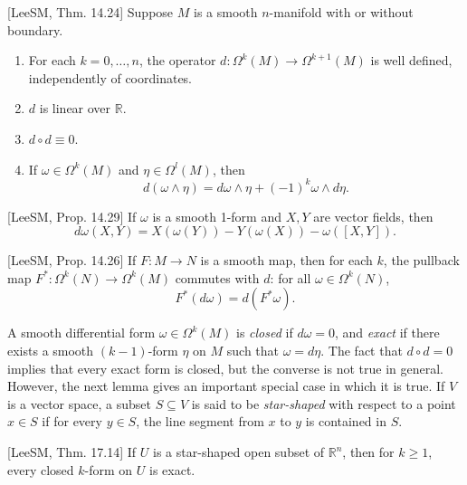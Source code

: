 \begin{proposition}
\label{prop:exterior-differentiation-properties}
[LeeSM, Thm. 14.24] Suppose $M$ is a smooth $n$-manifold with or without boundary.
\begin{enumerate}
\item[(a)] For each $k = 0, \ldots, n$, the operator $d: \Omega^k(M) \to \Omega^{k+1}(M)$ is well defined, independently of coordinates.
\item[(b)] $d$ is linear over $\mathbb{R}$.
\item[(c)] $d \circ d \equiv 0$.
\item[(d)] If $\omega \in \Omega^k(M)$ and $\eta \in \Omega^l(M)$, then
\[
d(\omega \wedge \eta) = d\omega \wedge \eta + (-1)^k \omega \wedge d\eta.
\]
\end{enumerate}
\end{proposition}

\begin{proposition}
\label{prop:exterior-derivative-one-form}
[LeeSM, Prop. 14.29] If $\omega$ is a smooth 1-form and $X, Y$ are vector fields, then
\[
d\omega(X,Y) = X(\omega(Y)) - Y(\omega(X)) - \omega([X,Y]).
\]
\end{proposition}

\begin{proposition}
\label{prop:exterior-derivative-naturality}
[LeeSM, Prop. 14.26] If $F: M \to N$ is a smooth map, then for each $k$, the pullback map $F^*: \Omega^k(N) \to \Omega^k(M)$ commutes with $d$: for all $\omega \in \Omega^k(N)$,
\begin{equation}
F^*(d\omega) = d(F^*\omega). \tag{B.12}
\end{equation}
\end{proposition}

A smooth differential form $\omega \in \Omega^k(M)$ is \emph{closed} if $d\omega = 0$, and \emph{exact} if there exists a smooth $(k-1)$-form $\eta$ on $M$ such that $\omega = d\eta$. The fact that $d \circ d = 0$ implies that every exact form is closed, but the converse is not true in general. However, the next lemma gives an important special case in which it is true. If $V$ is a vector space, a subset $S \subseteq V$ is said to be \emph{star-shaped} with respect to a point $x \in S$ if for every $y \in S$, the line segment from $x$ to $y$ is contained in $S$.

\begin{lemma}
\label{lem:poincare-lemma}
[LeeSM, Thm. 17.14] If $U$ is a star-shaped open subset of $\mathbb{R}^n$, then for $k \geq 1$, every closed $k$-form on $U$ is exact.
\end{lemma}

